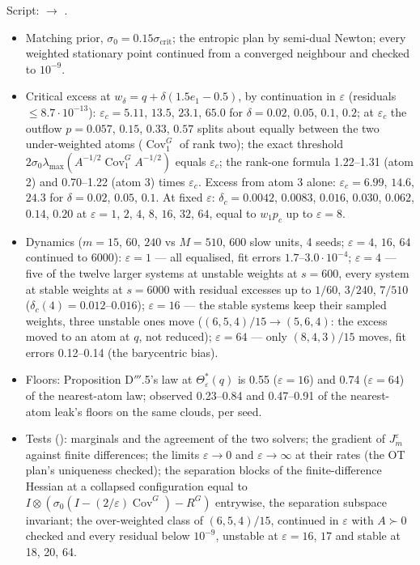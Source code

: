 Script:  $\to$ .
\begin{itemize}
  \item Matching prior, $\sigma_0=0.15\sigma_{\mathrm{crit}}$; the entropic plan by semi-dual Newton; every weighted
    stationary point continued from a converged neighbour and checked to $10^{-9}$.
  \item Critical excess at $w_\delta=q+\delta(1.5e_1-0.5)$, by continuation in $\varepsilon$ (residuals
    $\le8.7\cdot10^{-13}$): $\varepsilon_c=5.11$, $13.5$, $23.1$, $65.0$ for $\delta=0.02$, $0.05$, $0.1$, $0.2$; at
    $\varepsilon_c$ the outflow $p=0.057$, $0.15$, $0.33$, $0.57$ splits about equally between the two
    under-weighted atoms ($\operatorname{Cov}^G_1$ of rank two); the exact threshold
    $2\sigma_0\lambda_{\max}(A^{-1/2}\operatorname{Cov}^G_1A^{-1/2})$ equals $\varepsilon_c$; the rank-one formula
    1.22--1.31 (atom 2) and 0.70--1.22 (atom 3) times $\varepsilon_c$. Excess from atom 3 alone:
    $\varepsilon_c=6.99$, $14.6$, $24.3$ for $\delta=0.02$, $0.05$, $0.1$. At fixed $\varepsilon$:
    $\delta_c=0.0042$, $0.0083$, $0.016$, $0.030$, $0.062$, $0.14$, $0.20$ at $\varepsilon=1$, $2$, $4$, $8$, $16$,
    $32$, $64$, equal to $w_1p_c$ up to $\varepsilon=8$.
  \item Dynamics ($m=15$, $60$, $240$ vs $M=510$, 600 slow units, 4 seeds; $\varepsilon=4$, $16$, $64$ continued to
    6000): $\varepsilon=1$ --- all equalised, fit errors $1.7$--$3.0\cdot10^{-4}$; $\varepsilon=4$ --- five of the
    twelve larger systems at unstable weights at $s=600$, every system at stable weights at $s=6000$ with residual
    excesses up to $1/60$, $3/240$, $7/510$ ($\delta_c(4)=0.012$--$0.016$); $\varepsilon=16$ --- the stable systems
    keep their sampled weights, three unstable ones move ($(6,5,4)/15\to(5,6,4)$: the excess moved to an atom at
    $q$, not reduced); $\varepsilon=64$ --- only $(8,4,3)/15$ moves, fit errors 0.12--0.14 (the barycentric bias).
  \item Floors: Proposition D$'''$.5's law at $\Theta^*_\varepsilon(q)$ is 0.55 ($\varepsilon=16$) and 0.74
    ($\varepsilon=64$) of the nearest-atom law; observed 0.23--0.84 and 0.47--0.91 of the nearest-atom leak's floors
    on the same clouds, per seed.
  \item Tests (): marginals and the agreement of the two solvers; the gradient of
    $J^\varepsilon_m$ against finite differences; the limits $\varepsilon\to0$ and $\varepsilon\to\infty$ at their
    rates (the OT plan's uniqueness checked); the separation blocks of the finite-difference Hessian at a collapsed
    configuration equal to $I\otimes(\sigma_0(I-(2/\varepsilon)\operatorname{Cov}^G)-R^G)$ entrywise, the separation
    subspace invariant; the over-weighted class of $(6,5,4)/15$, continued in $\varepsilon$ with $A\succ0$ checked
    and every residual below $10^{-9}$, unstable at $\varepsilon=16$, $17$ and stable at 18, 20, 64.
\end{itemize}

